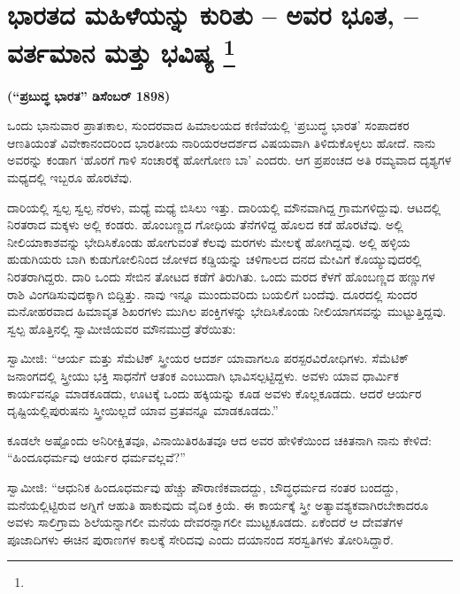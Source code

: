 
\chapter[ಭಾರತದ ಮಹಿಳೆಯನ್ನು ಕುರಿತು – ಅವರ ಭೂತ, – ವರ್ತಮಾನ ಮತ್ತು ಭವಿಷ್ಯ ]{ಭಾರತದ ಮಹಿಳೆಯನ್ನು ಕುರಿತು – ಅವರ ಭೂತ, – ವರ್ತಮಾನ ಮತ್ತು ಭವಿಷ್ಯ \protect\footnote{}}

\centerline{\textbf{(“ಪ್ರಬುದ್ಧ ಭಾರತ” ಡಿಸೆಂಬರ್​ 1898)}}

\vskip 3pt

ಒಂದು ಭಾನುವಾರ ಪ್ರಾತಃಕಾಲ, ಸುಂದರವಾದ ಹಿಮಾಲಯದ ಕಣಿವೆಯಲ್ಲಿ ‘ಪ್ರಬುದ್ಧ ಭಾರತ’ ಸಂಪಾದಕರ ಆಣತಿಯಂತೆ ವಿವೇಕಾನಂದರಿಂದ ಭಾರತೀಯ ನಾರಿಯರ\break ಆದರ್ಶದ ವಿಷಯವಾಗಿ ತಿಳಿದುಕೊಳ್ಳಲು ಹೋದೆ. ನಾನು ಅವರನ್ನು ಕಂಡಾಗ ‘ಹೊರಗೆ ಗಾಳಿ ಸಂಚಾರಕ್ಕೆ ಹೋಗೋಣ ಬಾ’ ಎಂದರು. ಆಗ ಪ್ರಪಂಚದ ಅತಿ ರಮ್ಯವಾದ ದೃಶ್ಯಗಳ ಮಧ್ಯದಲ್ಲಿ ಇಬ್ಬರೂ ಹೊರಟೆವು.

\vskip 3pt

ದಾರಿಯಲ್ಲಿ ಸ್ವಲ್ಪ ಸ್ವಲ್ಪ ನೆರಳು, ಮಧ್ಯೆ ಮಧ್ಯೆ ಬಿಸಿಲು ಇತ್ತು. ದಾರಿಯಲ್ಲಿ ಮೌನವಾಗಿದ್ದ ಗ್ರಾಮಗಳಿದ್ದುವು. ಆಟದಲ್ಲಿ ನಿರತರಾದ ಮಕ್ಕಳು ಅಲ್ಲಿ ಕಂಡರು. ಹೊಂಬಣ್ಣದ ಗೋಧಿಯ ತೆನೆಗಳಿದ್ದ ಹೊಲದ ಕಡೆ ಹೊರಟೆವು. ಅಲ್ಲಿ ನೀಲಿಯಾಕಾಶವನ್ನು ಭೇದಿಸಿಕೊಂಡು ಹೋಗುವಂತೆ ಕೆಲವು ಮರಗಳು ಮೇಲಕ್ಕೆ ಹೋಗಿದ್ದವು. ಅಲ್ಲಿ ಹಳ್ಳಿಯ ಹುಡುಗಿಯರು ಬಾಗಿ ಕುಡುಗೋಲಿನಿಂದ ಜೋಳದ ಕಡ್ಡಿಯನ್ನು ಚಳಿಗಾಲದ ದನದ ಮೇವಿಗೆ ಕೊಯ್ಯುವುದರಲ್ಲಿ ನಿರತರಾಗಿದ್ದರು. ದಾರಿ ಒಂದು ಸೇಬಿನ ತೋಟದ ಕಡೆಗೆ ತಿರುಗಿತು. ಒಂದು ಮರದ ಕೆಳಗೆ ಹೊಂಬಣ್ಣದ ಹಣ್ಣುಗಳ ರಾಶಿ ವಿಂಗಡಿಸುವುದಕ್ಕಾಗಿ ಬಿದ್ದಿತ್ತು. ನಾವು ಇನ್ನೂ ಮುಂದುವರಿದು ಬಯಲಿಗೆ ಬಂದೆವು. ದೂರದಲ್ಲಿ ಸುಂದರ ಮನೋಹರವಾದ ಹಿಮಾವೃತ ಶಿಖರಗಳು ಮುಗಿಲ ಪಂಕ್ತಿಗಳನ್ನು ಭೇದಿಸಿಕೊಂಡು ನೀಲಿಯಾಗಸವನ್ನು ಮುಟ್ಟುತ್ತಿದ್ದವು. ಸ್ವಲ್ಪ ಹೊತ್ತಿನಲ್ಲಿ ಸ್ವಾಮೀಜಿಯವರ ಮೌನಮುದ್ರೆ ತೆರೆಯಿತು:

\vskip 3pt

ಸ್ವಾಮೀಜಿ: “ಆರ್ಯ ಮತ್ತು ಸೆಮೆಟಿಕ್​ ಸ್ತ್ರೀಯರ ಆದರ್ಶ ಯಾವಾಗಲೂ ಪರಸ್ಪರ\break ವಿರೋಧಿಗಳು. ಸೆಮೆಟಿಕ್​ ಜನಾಂಗದಲ್ಲಿ ಸ್ತ್ರೀಯು ಭಕ್ತಿ ಸಾಧನೆಗೆ ಆತಂಕ ಎಂಬುದಾಗಿ ಭಾವಿಸಲ್ಪಟ್ಟಿದ್ದಳು. ಅವಳು ಯಾವ ಧಾರ್ಮಿಕ ಕಾರ್ಯವನ್ನೂ ಮಾಡಕೂಡದು, ಊಟಕ್ಕೆ ಒಂದು ಹಕ್ಕಿಯನ್ನು ಕೂಡ ಅವಳು ಕೊಲ್ಲಕೂಡದು. ಆದರೆ ಆರ್ಯರ ದೃಷ್ಟಿಯಲ್ಲಿ\break ಪುರುಷನು ಸ್ತ್ರೀಯಿಲ್ಲದೆ ಯಾವ ವ್ರತವನ್ನೂ ಮಾಡಕೂಡದು.”

\vskip 3pt

ಕೂಡಲೇ ಅಷ್ಟೊಂದು ಅನಿರೀಕ್ಷಿತವೂ, ವಿನಾಯಿತಿರಹಿತವೂ ಆದ ಅವರ ಹೇಳಿಕೆಯಿಂದ ಚಕಿತನಾಗಿ ನಾನು ಕೇಳಿದೆ: “ಹಿಂದೂಧರ್ಮವು ಆರ್ಯರ ಧರ್ಮವಲ್ಲವೆ?”

\vskip 3pt

ಸ್ವಾಮೀಜಿ: “ಆಧುನಿಕ ಹಿಂದೂಧರ್ಮವು ಹೆಚ್ಚು ಪೌರಾಣಿಕವಾದದ್ದು, ಬೌದ್ಧಧರ್ಮದ ನಂತರ ಬಂದದ್ದು, ಮನೆಯಲ್ಲಿಟ್ಟಿರುವ ಅಗ್ನಿಗೆ ಆಹುತಿ ಹಾಕುವುದು ವೈದಿಕ ಕ್ರಿಯೆ. ಈ ಕಾರ್ಯಕ್ಕೆ ಸ್ತ್ರೀ ಅತ್ಯಾವಶ್ಯಕವಾಗಿರಬೇಕಾದರೂ ಅವಳು ಸಾಲಿಗ್ರಾಮ ಶಿಲೆಯನ್ನಾಗಲೀ ಮನೆಯ ದೇವರನ್ನಾಗಲೀ ಮುಟ್ಟಕೂಡದು. ಏಕೆಂದರೆ ಆ ದೇವತೆಗಳ ಪೂಜಾದಿಗಳು ಈಚಿನ ಪುರಾಣಗಳ ಕಾಲಕ್ಕೆ ಸೇರಿದವು ಎಂದು ದಯಾನಂದ ಸರಸ್ವತಿಗಳು ತೋರಿಸಿದ್ದಾರೆ.

